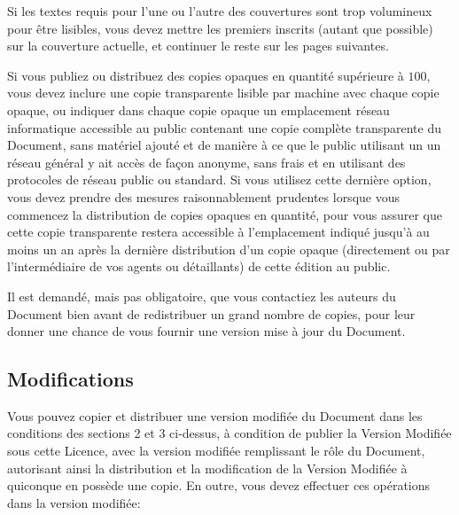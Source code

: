 	Si les textes requis pour l'une ou l'autre des couvertures sont trop volumineux pour être lisibles, vous devez mettre les premiers inscrits (autant que possible) sur la couverture actuelle, et continuer le reste sur les pages suivantes.

	Si vous publiez ou distribuez des copies opaques en quantité supérieure à $100$, vous devez inclure une copie transparente lisible par machine avec chaque copie opaque, ou indiquer dans chaque copie opaque un emplacement réseau informatique accessible au public contenant une copie complète transparente du Document, sans matériel ajouté et de manière à ce que le public utilisant un un réseau général y ait accès de façon anonyme, sans frais et en utilisant des protocoles de réseau public ou standard. Si vous utilisez cette dernière option, vous devez prendre des mesures raisonnablement prudentes lorsque vous commencez la distribution de copies opaques en quantité, pour vous assurer que cette copie transparente restera accessible à l'emplacement indiqué jusqu'à au moins un an après la dernière distribution d'un copie opaque (directement ou par l'intermédiaire de vos agents ou détaillants) de cette édition au public.

	Il est demandé, mais pas obligatoire, que vous contactiez les auteurs du Document bien avant de redistribuer un grand nombre de copies, pour leur donner une chance de vous fournir une version mise à jour du Document.

	\subsection{Modifications}
	Vous pouvez copier et distribuer une version modifiée du Document dans les conditions des sections 2 et 3 ci-dessus, à condition de publier la Version Modifiée sous cette Licence, avec la version modifiée remplissant le rôle du Document, autorisant ainsi la distribution et la modification de la Version Modifiée à quiconque en possède une copie. En outre, vous devez effectuer ces opérations dans la version modifiée:
	
